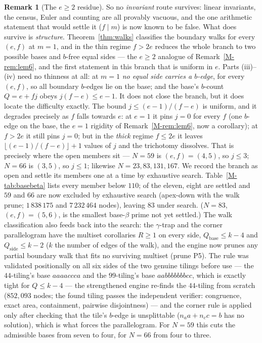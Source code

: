 \documentclass[11pt,reqno]{amsart}
\theoremstyle{plain}
\theoremstyle{definition}
\newtheorem{remark}[theorem]{Remark}
\begin{document}
\begin{remark}[The $e\ge2$ residue]
So no \emph{invariant} route survives: linear invariants, the census, Euler and counting are all
provably vacuous, and the one arithmetic statement that would settle it ($f\mid m$) is now known to
be false. What does survive is \emph{structure}. Theorem~\ref{thm:walks} classifies the boundary walks
for every $(e,f)$ at $m=1$, and in the thin regime $f>2e$ reduces the whole branch to two possible
bases and $b$-free equal sides --- the $e\ge2$ analogue of Remark~\ref{M-rem:lem6}, and the first
statement in this branch that is uniform in $e$. Parts (iii)--(iv) need no thinness at all: at $m=1$ \emph{no equal side carries a $b$-edge}, for every
$(e,f)$, so all boundary $b$-edges lie on the base; and the base's $b$-count $Q=e+fj$ obeys
$j(f-e)\le e-1$. It does not close the branch, but it does locate the difficulty exactly. The bound
$j\le(e-1)/(f-e)$ is uniform, and it degrades precisely as $f$ falls towards $e$: at $e=1$ it pins
$j=0$ for every $f$ (one $b$-edge on the base, the $e=1$ rigidity of Remark~\ref{M-rem:lem6},
now a corollary); at $f>2e$ it still pins $j=0$; but in the \emph{thick} regime $f\le2e$ it leaves
$\lfloor(e-1)/(f-e)\rfloor+1$ values of $j$ and the trichotomy dissolves. That is precisely where the
open members sit --- $N=59$ is $(e,f)=(4,5)$, so $j\le3$; $N=66$ is $(3,5)$, so $j\le1$; likewise
$N=23,83,131,167$. We record the branch as open and settle its members one at a time by exhaustive
search. Table~\ref{M-tab:basebeta} lists every member below $110$; of the eleven, eight are settled and
$59$ and $66$ are now excluded by exhaustive search (apex-down with the walk prune; $1\,838\,175$ and
$7\,232\,464$ nodes), leaving $83$ under search. ($N=83$, $(e,f)=(5,6)$, is the smallest base-$\beta$
prime not yet settled.)
The walk classification also feeds back into the search: the $\gamma$-trap and the corner
parallelogram have the multiset corollaries $R\ge1$ on every side, $Q_{\mathrm{base}}\le k-4$ and
$Q_{\mathrm{side}}\le k-2$ ($k$ the number of edges of the walk), and the engine now prunes any
partial boundary walk that fits no surviving multiset (prune P5). The rule was validated positionally
on all six sides of the two genuine tilings before use --- the $44$-tiling's base $aaaaccca$ and the
$99$-tiling's base $aabbbbbbbcc$, which is exactly tight for $Q\le k-4$ --- the strengthened engine
re-finds the $44$-tiling from scratch ($852{,}093$ nodes; the found tiling passes the independent
verifier: congruence, exact area, containment, pairwise disjointness) --- and the corner rule is
applied only after checking that the tile's $b$-edge is unsplittable ($n_a a + n_c c = b$ has no
solution), which is what forces the parallelogram. For $N=59$ this cuts the admissible bases from
seven to four, for $N=66$ from four to three.
\end{remark}
\end{document}
